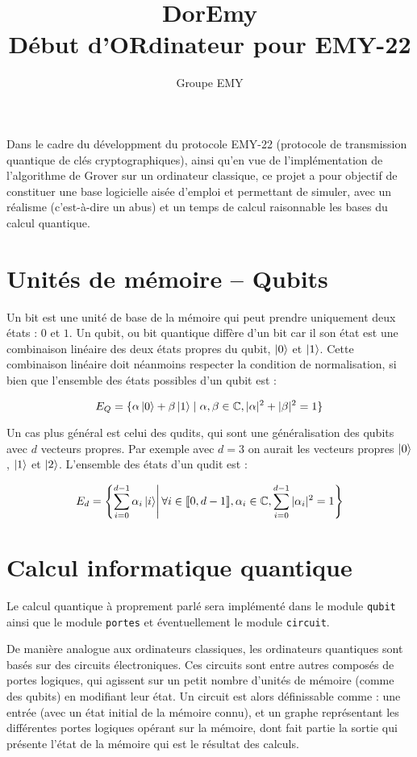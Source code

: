 \documentclass[french]{article}
\title{%
    DorEmy \\
    \large Début d'ORdinateur pour EMY-22}
\author{Groupe EMY}
\newcommand{\p}{\texttt} %
\newcommand{\somme}{\displaystyle\sum}
\begin{document}
\maketitle

Dans le cadre du développment du protocole EMY-22 (protocole de transmission quantique de clés cryptographiques), ainsi qu'en vue de l'implémentation de l'algorithme de Grover sur un ordinateur classique, ce projet a pour objectif de constituer une base logicielle aisée d'emploi et permettant de simuler, avec un réalisme (c'est-à-dire un abus) et un temps de calcul raisonnable les bases du calcul quantique.


\section{Unités de mémoire – Qubits}

Un bit est une unité de base de la mémoire qui peut prendre uniquement deux états : $0$ et $1$. Un qubit, ou bit quantique diffère d'un bit car il son état est une combinaison linéaire des deux états propres du qubit, $\ket{0}$ et $\ket{1}$. Cette combinaison linéaire doit néanmoins respecter la condition de normalisation, si bien que l'ensemble des états possibles d'un qubit est :

\[ E_Q = \{\alpha \ket 0 + \beta \ket 1 \mid \alpha, \beta \in \mathbb{C}, |\alpha|^2 + |\beta|^2 = 1\} \]

Un cas plus général est celui des qudits, qui sont une généralisation des qubits avec $d$ vecteurs propres. Par exemple avec $d = 3$ on aurait les vecteurs propres $\ket 0$, $\ket 1$ et $\ket 2$. L'ensemble des états d'un qudit est :

$$ E_d = \left\{ \somme_{i = 0}^{d - 1} \alpha_i \ket i \middle|\, \forall i \in \llbracket 0, d-1 \rrbracket, \alpha_i \in \mathbb{C},  \somme_{i = 0}^{d - 1} |\alpha_i|^2 = 1\right\} $$


\section{Calcul informatique quantique}


Le calcul quantique à proprement parlé sera implémenté dans le module \p{qubit} ainsi que le module \p{portes} et éventuellement le module \p{circuit}.

De manière analogue aux ordinateurs classiques, les ordinateurs quantiques sont basés sur des circuits électroniques. Ces circuits sont entre autres composés de portes logiques, qui agissent sur un petit nombre d'unités de mémoire (comme des qubits) en modifiant leur état. Un circuit est alors définissable comme : une entrée (avec un état initial de la mémoire connu), et un graphe représentant les différentes portes logiques opérant sur la mémoire, dont fait partie la sortie qui présente l'état de la mémoire qui est le résultat des calculs.
\end{document}
